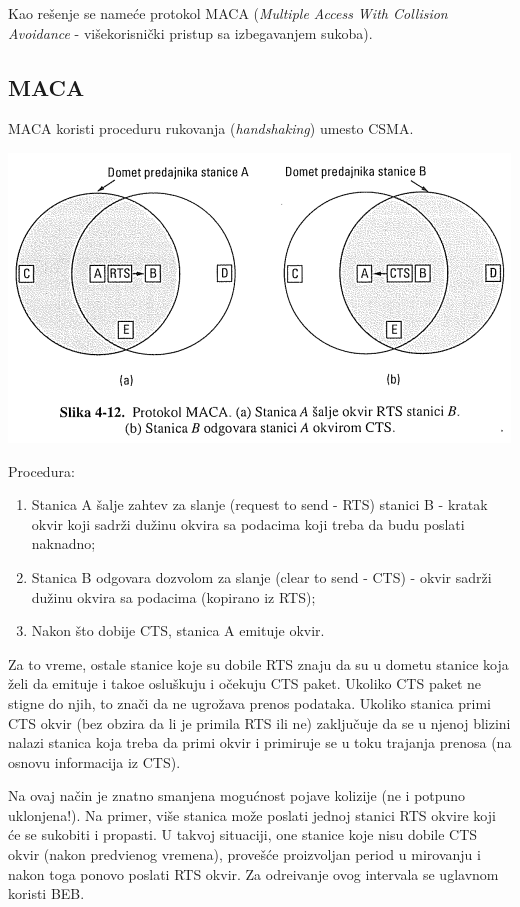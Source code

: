 \documentclass{article} %
\begin{document}
Kao re\v{s}enje se name\'{c}e protokol MACA (\textit{Multiple Access With Collision Avoidance} - vi\v{s}ekorisni\v{c}ki pristup sa izbegavanjem sukoba).

\subsection{MACA}

MACA koristi proceduru rukovanja (\textit{handshaking}) umesto CSMA.

\begin{center}
	\includegraphics[scale=0.5]{maca}
\end{center}

Procedura:
\begin{enumerate}
	\item Stanica A \v{s}alje zahtev za slanje (request to send - RTS) stanici B - kratak okvir koji sadr\v{z}i du\v{z}inu okvira sa podacima koji treba da budu poslati naknadno;
	\item Stanica B odgovara dozvolom za slanje (clear to send - CTS) - okvir sadr\v{z}i du\v{z}inu okvira sa podacima (kopirano iz RTS);
	\item Nakon \v{s}to dobije CTS, stanica A emituje okvir.
\end{enumerate}

Za to vreme, ostale stanice koje su dobile RTS znaju da su u dometu stanice koja \v{z}eli da emituje i tako\dj{}e oslu\v{s}kuju i o\v{c}ekuju CTS paket. Ukoliko CTS paket ne stigne do njih, to zna\v{c}i da ne ugro\v{z}ava prenos podataka. Ukoliko stanica primi CTS okvir (bez obzira da li je primila RTS ili ne) zaklju\v{c}uje da se u njenoj blizini nalazi stanica koja treba da primi okvir i primiruje se u toku trajanja prenosa (na osnovu informacija iz CTS).

Na ovaj na\v{c}in je znatno smanjena mogu\'{c}nost pojave kolizije (ne i potpuno uklonjena!). Na primer, vi\v{s}e stanica mo\v{z}e poslati jednoj stanici RTS okvire koji \'{c}e se sukobiti i propasti. U takvoj situaciji, one stanice koje nisu dobile CTS okvir (nakon predvi\dj{}enog vremena), prove\v{s}\'{c}e proizvoljan period u mirovanju i nakon toga ponovo poslati RTS okvir. Za odre\dj{}ivanje ovog intervala se uglavnom koristi BEB.
\end{document}
